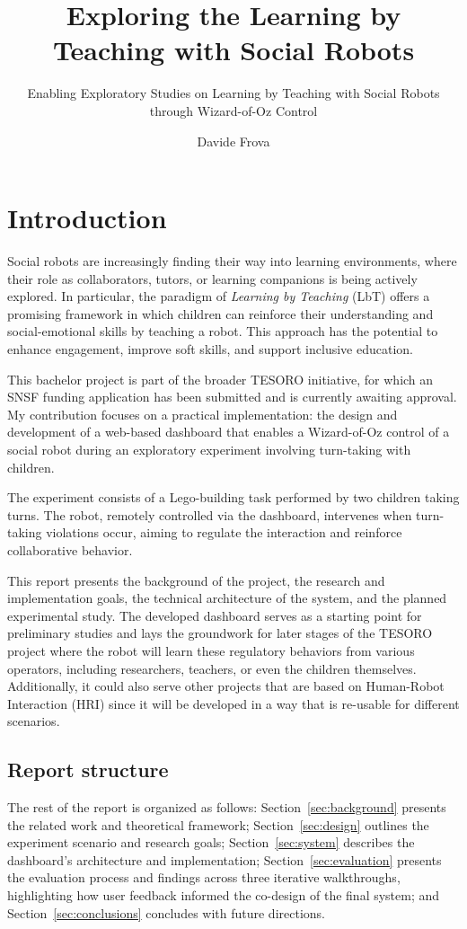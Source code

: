 \documentclass[a4paper]{usiinfbachelorproject}
\author{Davide Frova}
\title{\textbf{Exploring the Learning by Teaching with Social Robots}}
\subtitle{Enabling Exploratory Studies on Learning by Teaching with Social Robots through Wizard-of-Oz Control}
\begin{document}
\maketitle
\tableofcontents\newpage

\section{\textbf{Introduction}}

Social robots are increasingly finding their way into learning environments, where their role as collaborators, tutors, or learning companions is being actively explored. In particular, the paradigm of \textit{Learning by Teaching} (LbT) offers a promising framework in which children can reinforce their understanding and social-emotional skills by teaching a robot. This approach has the potential to enhance engagement, improve soft skills, and support inclusive education.

This bachelor project is part of the broader TESORO initiative, for which an SNSF funding application has been submitted and is currently awaiting approval. My contribution focuses on a practical implementation: the design and development of a web-based dashboard that enables a Wizard-of-Oz control of a social robot during an exploratory experiment involving turn-taking with children.

The experiment consists of a Lego-building task performed by two children taking turns. The robot, remotely controlled via the dashboard, intervenes when turn-taking violations occur, aiming to regulate the interaction and reinforce collaborative behavior.

This report presents the background of the project, the research and implementation goals, the technical architecture of the system, and the planned experimental study.
The developed dashboard serves as a starting point for preliminary studies and lays the groundwork for later stages of the TESORO project where the robot will learn these regulatory behaviors from various operators, including researchers, teachers, or even the children themselves. Additionally, it could also serve other projects that are based on Human-Robot Interaction (HRI) since it will be developed in a way that is re-usable for different scenarios.

\subsection{\textbf{Report structure}}
The rest of the report is organized as follows: Section~\ref{sec:background} presents the related work and theoretical framework; Section~\ref{sec:design} outlines the experiment scenario and research goals; Section~\ref{sec:system} describes the dashboard's architecture and implementation; Section~\ref{sec:evaluation} presents the evaluation process and findings across three iterative walkthroughs, highlighting how user feedback informed the co-design of the final system; and Section~\ref{sec:conclusions} concludes with future directions.
\end{document}
